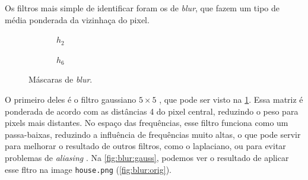 Os filtros mais simple de identificar foram os de \textit{blur}, que fazem um tipo de média ponderada da vizinhaça do pixel.

\begin{figure}[H]
    \centering
    \begin{subfigure}{0.4\textwidth}
        \centering
        
        \caption{~$h_2$}
        \label{fig:h2}
    \end{subfigure}%
    \begin{subfigure}{0.4\textwidth}
        \centering
        
        \caption{~$h_6$}
        \label{fig:h6}
    \end{subfigure}

    \caption{Máscaras de \textit{blur}.}
    \label{fig:blur:kernel}
\end{figure}

O primeiro deles é o filtro gaussiano $5 \times 5$ \autocite{ref:gaussian}, que pode ser visto na \cref{fig:h2}. Essa matriz é ponderada de acordo com as distâncias 4 do pixel central, reduzindo o peso para pixels mais distantes. No espaço das frequências, esse filtro funciona como um passa-baixas, reduzindo a influência de frequências muito altas, o que pode servir para melhorar o resultado de outros filtros, como o laplaciano, ou para evitar problemas de \textit{aliasing} \autocite{ref:gaussian-lowpass}. Na \cref{fig:blur:gauss}, podemos ver o resultado de aplicar esse fltro na image \texttt{house.png} (\ref{fig:blur:orig}).

